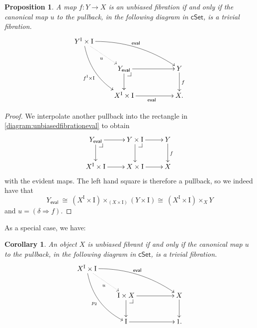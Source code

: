 \documentclass[11pt]{amsart}
\makeatletter
\newcommand{\cSet}{\ensuremath{\mathsf{cSet}}}
\newcommand{\ra}{\ensuremath{\rightarrow}}
\newcommand{\I}{\ensuremath{\mathrm{I}}}
\newtheorem{proposition}[theorem]{Proposition}
\newtheorem{corollary}[theorem]{Corollary}
\theoremstyle{remark}
\theoremstyle{definition}
\newcommand{\pbcorner}[1][dr]{\save*!/#1-1.2pc/#1:(-1,1)@^{|-}\restore}
\makeatother
\begin{document}
\begin{proposition}
A map $f : Y\ra X$ is an unbiased fibration if and only if the canonical map $u$ to the pullback, in the following diagram in $\cSet$, is a trivial fibration.
\begin{equation}\label{diagram:unbiasedfibrationeval}
\xymatrix{
Y^\I\times \I \ar@/^3ex/ [rrrd]^{\mathsf{eval}} \ar@/_3ex/ [rdd]_{f^\I\times \I} \ar@{..>}[rd]_{u}  && \\
& Y_\mathsf{eval} \pbcorner  \ar[d] \ar[rr] && Y \ar[d]^f \\
& X^\I \times \I \ar[rr]_{\mathsf{eval}} && X.
}
\end{equation}
\end{proposition}
\begin{proof}
We interpolate another pullback into the rectangle in \eqref{diagram:unbiasedfibrationeval} to obtain
\begin{equation}\label{diagram:unbiasedfibrationeval2}
\xymatrix{
 Y_\mathsf{eval} \pbcorner  \ar[d] \ar[r] & Y\times \I \ar[d] \pbcorner \ar[r] & Y \ar[d]^f \\
 X^\I \times \I \ar[r] & X\times \I \ar[r] & X
}
\end{equation}
with the evident maps. The left hand square is therefore a pullback, so we indeed have that 
\[
Y_\mathsf{eval}\ \cong\ (X^\I \times \I)\times_{(X\times \I)} (Y\times\I) \cong\ (X^\I \times \I)\times_{X} Y
\]
and $u = (\delta\Rightarrow\! f)$.
\end{proof}

As a special case, we have:
\begin{corollary}\label{cor:unbiasedfibrant}
An object $X$ is unbiased fibrant if and only if the canonical map $u$ to the pullback, in the following diagram in $\cSet$, is a trivial fibration.
\begin{equation}\label{diagram:unbiasedfibrationeval}
\xymatrix{
X^\I\times \I \ar@/^3ex/ [rrrd]^{\mathsf{eval}} \ar@/_3ex/ [rdd]_{p_2} \ar@{..>}[rd]_{u}  && \\
& \I\times X \pbcorner  \ar[d] \ar[rr] && X \ar[d] \\
& \I \ar[rr] && 1.
}
\end{equation}
\end{corollary}
\end{document}
